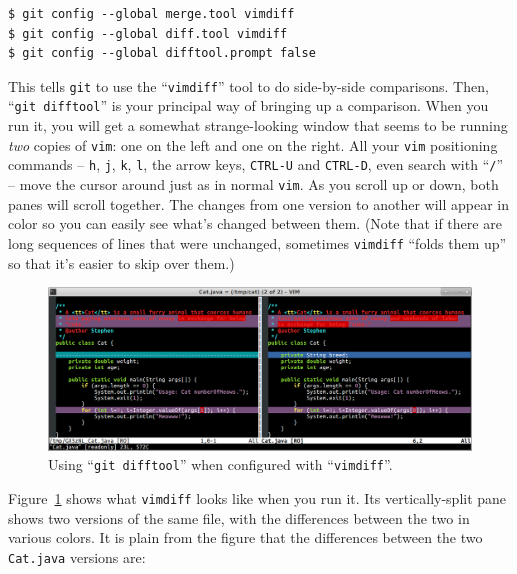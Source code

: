 \begin{Verbatim}[fontsize=\small,samepage=true,frame=none]
$ git config --global merge.tool vimdiff
$ git config --global diff.tool vimdiff
$ git config --global difftool.prompt false
\end{Verbatim}

This tells \texttt{git} to use the ``\texttt{vimdiff}'' tool to do
side-by-side comparisons. Then, ``\texttt{git difftool}'' is your principal
way of bringing up a comparison. When you run it, you will get a somewhat
strange-looking window that seems to be running \textit{two} copies of
\texttt{vim}: one on the left and one on the right. All your \texttt{vim}
positioning commands -- \texttt{h}, \texttt{j}, \texttt{k}, \texttt{l}, the
arrow keys, \texttt{CTRL-U} and \texttt{CTRL-D}, even search with
``\texttt{/}'' -- move the cursor around just as in normal \texttt{vim}. As
you scroll up or down, both panes will scroll together. The changes from one
version to another will appear in color so you can easily see what's changed
between them. (Note that if there are long sequences of lines that were
unchanged, sometimes \texttt{vimdiff} ``folds them up'' so that it's easier to
skip over them.) 

\begin{figure}
\centering
\hspace*{-.2in}
\includegraphics[width=1.05\textwidth]{catDiff.png}
\vspace{-.05in}
\caption{Using ``\texttt{git difftool}'' when configured with ``\texttt{vimdiff}''.}
\label{fig:catDiff}
\end{figure}

Figure~\ref{fig:catDiff} shows what \texttt{vimdiff} looks like when you run
it. Its vertically-split pane shows two versions of the same file, with the
differences between the two in various colors. It is plain from the figure
that the differences between the two \texttt{Cat.java} versions are:

